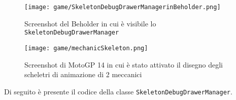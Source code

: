	\begin{figure}[h!] 
		\centering 
		\hspace*{-0.05\columnwidth}\texttt{[image: game/SkeletonDebugDrawerManagerinBeholder.png]} 
		\caption{Screenshot del Beholder in cui è visibile lo \texttt{SkeletonDebugDrawerManager}}
	\end{figure}
	
	\begin{figure}[h!] 
		\centering 
		\hspace*{-0.05\columnwidth}\texttt{[image: game/mechanicSkeleton.png]} 
		\caption{Screenshot di MotoGP 14 in cui è stato attivato il disegno degli scheletri di animazione di 2 meccanici}
	\end{figure}
	
	Di seguito è presente il codice della classe \texttt{SkeletonDebugDrawerManager}.
	
	
	
	